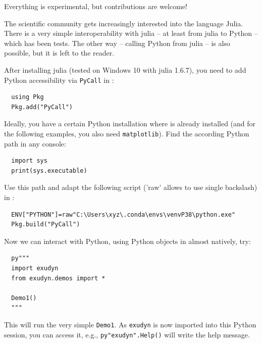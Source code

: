 Everything is experimental, but contributions are welcome!

The scientific community gets increasingly interested into the language Julia.
There is a very simple interoperability with julia -- at least from julia to Python -- which has been tests.
The other way -- calling Python from julia -- is also possible, but it is left to the reader.

After installing julia (tested on Windows 10 with julia 1.6.7), you need to add Python accessibility via \texttt{PyCall}
in :
\begin{lstlisting}
  using Pkg
  Pkg.add("PyCall")
\end{lstlisting}
%
Ideally, you have a certain Python installation where \codeName is already installed (and for the following examples, you also need \texttt{matplotlib}). Find the according Python path in any  console:
\pythonstyle\begin{lstlisting}
  import sys
  print(sys.executable)
\end{lstlisting}
%
Use this path and adapt the following  script ('raw' allows to use single backslash) in :
\begin{lstlisting}
  ENV["PYTHON"]=raw"C:\Users\xyz\.conda\envs\venvP38\python.exe"
  Pkg.build("PyCall")
\end{lstlisting}
%
Now we can interact with Python, using Python objects in  almost natively, try:
\begin{lstlisting}
  py"""
  import exudyn
  from exudyn.demos import *

  Demo1()
  """
\end{lstlisting}
This will run the very simple \codeName \texttt{Demo1}.
As \texttt{exudyn} is now imported into this Python session, you can access it, e.g., \texttt{py"exudyn".Help()} 
will write the help message.

